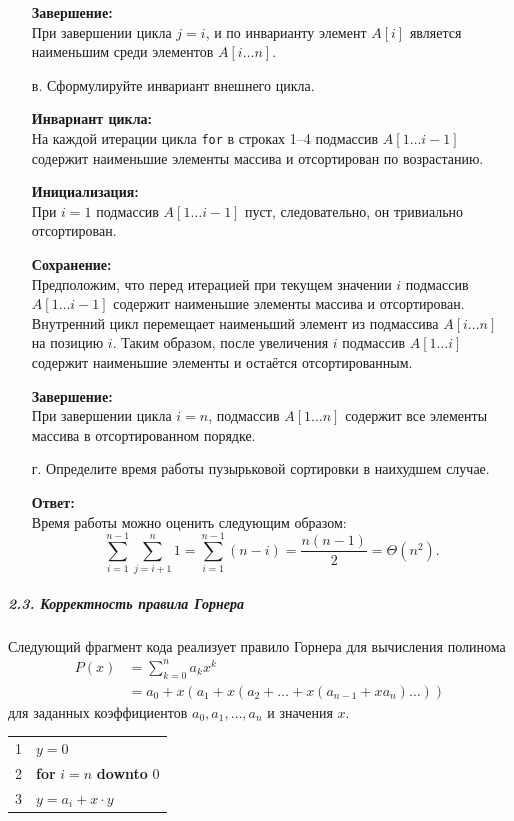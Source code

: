 \begin{enumerate}
    \textbf{Завершение:} \\
    При завершении цикла $j = i$, и по инварианту элемент $A[i]$
    является наименьшим среди элементов $A[i \ldots n]$.

    \item[в.] Сформулируйте инвариант внешнего цикла.

    \textbf{Инвариант цикла:} \\
    На каждой итерации цикла \texttt{for} в строках 1--4 подмассив $A[1 \ldots i-1]$
    содержит наименьшие элементы массива и отсортирован по возрастанию.

    \textbf{Инициализация:} \\
    При $i = 1$ подмассив $A[1 \ldots i-1]$ пуст, следовательно, он тривиально отсортирован.

    \textbf{Сохранение:} \\
    Предположим, что перед итерацией при текущем значении $i$
    подмассив $A[1 \ldots i-1]$ содержит наименьшие элементы массива и отсортирован.
    Внутренний цикл перемещает наименьший элемент из подмассива $A[i \ldots n]$
    на позицию $i$.
    Таким образом, после увеличения $i$ подмассив $A[1 \ldots i]$
    содержит наименьшие элементы и остаётся отсортированным.

    \textbf{Завершение:} \\
    При завершении цикла $i = n$,
    подмассив $A[1 \ldots n]$ содержит все элементы массива в отсортированном порядке.

    \item[г.] Определите время работы пузырьковой сортировки в наихудшем случае.

    \textbf{Ответ:} \\
    Время работы можно оценить следующим образом:
    \[
    \sum_{i=1}^{n-1} \sum_{j=i+1}^{n} 1
    = \sum_{i=1}^{n-1} (n - i)
    = \frac{n(n-1)}{2}
    = \Theta(n^2).
    \]
\end{enumerate}

\subparagraph{2.3. Корректность правила Горнера}

Следующий фрагмент кода реализует правило Горнера для вычисления полинома
\[
\begin{aligned}
P(x) &= \sum_{k=0}^{n} a_k x^k \\
&= a_0 + x(a_1 + x(a_2 + \dots + x(a_{n-1} + x a_n) \dots))
\end{aligned}
\]
для заданных коэффициентов $a_0, a_1, \dots, a_n$ и значения $x$.

\medskip
\noindent
\begin{tabular}{ll}
1 & $y = 0$ \\
2 & \textbf{for} $i = n$ \textbf{downto} 0 \\
3 & \quad $y = a_i + x \cdot y$
\end{tabular}
\medskip

